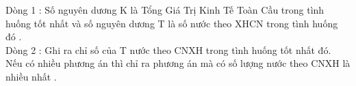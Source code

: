 Dòng 1 : Số nguyên dương K là Tổng Giá Trị Kinh Tế Toàn Cầu trong tình huống tốt nhất và số nguyên dương T là số nước theo XHCN trong tình huống đó .   
\\   Dòng 2 : Ghi ra chỉ số của T nước theo CNXH trong tình huống tốt nhất đó. Nếu có nhiều phương án thì chỉ ra phương án mà có số lượng nước theo CNXH là nhiều nhất .  

\
